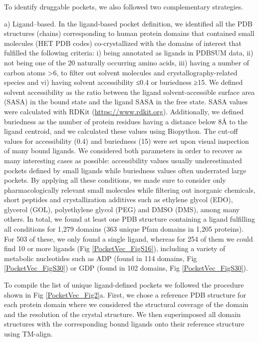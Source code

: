To identify druggable pockets, we also followed two complementary strategies.

a) Ligand--based. In the ligand-based pocket definition, we identified all the PDB structures (chains) corresponding to human protein domains that contained small molecules (HET PDB codes) co-crystallized with the domains of interest that fulfilled the following criteria: i) being annotated as ligands in PDBSUM\cite{laskowski_pdbsum_2018} data, ii) not being one of the 20 naturally occurring amino acids, iii) having a number of carbon atoms >6, to filter out solvent molecules and crystallography-related species and vi) having solvent accessibility ≤0.4 or buriedness ≥15. We defined solvent accessibility as the ratio between the ligand solvent-accessible surface area (SASA) in the bound state and the ligand SASA in the free state. SASA values were calculated with RDKit (\href{https://www.rdkit.org}{https://www.rdkit.org}). Additionally, we defined buriedness as the number of protein residues having a distance below 8Å to the ligand centroid, and we calculated these values using Biopython\cite{cock_biopython_2009}. The cut-off values for accessibility (0.4) and buriedness (15) were set upon visual inspection of many bound ligands. We considered both parameters in order to recover as many interesting cases as possible: accessibility values usually underestimated pockets defined by small ligands while buriedness values often underrated large pockets. By applying all these conditions, we made sure to consider only pharmacologically relevant small molecules while filtering out inorganic chemicals, short peptides and crystallization additives such as ethylene glycol (EDO), glycerol (GOL), polyethylene glycol (PEG) and DMSO (DMS), among many others. In total, we found at least one PDB structure containing a ligand fulfilling all conditions for 1,279 domains (363 unique Pfam domains in 1,205 proteins). For 503 of these, we only found a single ligand, whereas for 254 of them we could find 10 or more ligands (Fig \ref{PocketVec_FigS16}), including a variety of metabolic nucleotides such as ADP (found in 114 domains, Fig \ref{PocketVec_FigS30}) or GDP (found in 102 domains, Fig \ref{PocketVec_FigS30}).

To compile the list of unique ligand-defined pockets we followed the procedure shown in Fig \ref{PocketVec_Fig2}a. First, we chose a reference PDB structure for each protein domain where we considered the structural coverage of the domain and the resolution of the crystal structure. We then superimposed all domain structures with the corresponding bound ligands onto their reference structure using TM-align\cite{zhang_tm-align_2005}. 

